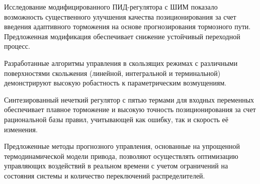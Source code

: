 Исследование модифицированного ПИД-регулятора с ШИМ показало возможность
существенного улучшения качества позиционирования за счет
введения адаптивного торможения на основе прогнозирования тормозного пути.
Предложенная модификация обеспечивает снижение устойчивый переходной процесс.

Разработанные алгоритмы управления в скользящих режимах с различными поверхностями
скольжения (линейной, интегральной и терминальной) демонстрируют
высокую робастность к параметрическим возмущениям.

Синтезированный нечеткий регулятор с пятью термами для входных переменных
обеспечивает плавное торможение и высокую точность позиционирования за счет
рациональной базы правил, учитывающей как ошибку, так и скорость её изменения.

Предложенные методы прогнозного управления, основанные на
упрощенной термодинамической модели привода, позволяют осуществлять
оптимизацию управляющих воздействий в реальном времени
с учетом ограничений на состояния системы и количество переключений распределителей.
